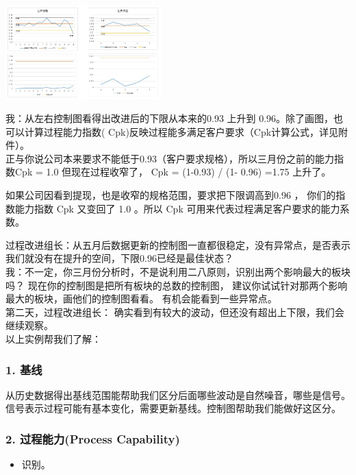 
\includegraphics[width=6cm]{控制图0.jpg}

我：从左右控制图看得出改进后的下限从本来的0.93 上升到
0.96。除了画图，也可以计算过程能力指数(
Cpk)反映过程能多满足客户要求（Cpk计算公式，详见附件）。\\
正与你说公司本来要求不能低于0.93（客户要求规格），所以三月份之前的能力指数Cpk
= 1.0 但现在过程收窄了， Cpk = (1-0.93) / (1- 0.96) =1.75 上升了。

如果公司因看到提现，也是收窄的规格范围，要求把下限调高到0.96 ，
你们的指数能力指数 Cpk 又变回了 1.0 。所以 Cpk
可用来代表过程满足客户要求的能力系数。

过程改进组长：从五月后数据更新的控制图一直都很稳定，没有异常点，是否表示我们就没有在提升的空间，下限0.96已经是最佳状态？\\
我：不一定，你三月份分析时，不是说利用二八原则，识别出两个影响最大的板块吗？
现在你的控制图是把所有板块的总数的控制图，
建议你试试针对那两个影响最大的板块，画他们的控制图看看。
有机会能看到一些异常点。\\
第二天，过程改进组长：
确实看到有较大的波动，但还没有超出上下限，我们会继续观察。\\
以上实例帮我们了解：

\hypertarget{ux57faux7ebf}{%
\subsubsection{1. 基线}\label{ux57faux7ebf}}

从历史数据得出基线范围能帮助我们区分后面哪些波动是自然噪音，哪些是信号。
信号表示过程可能有基本变化，需要更新基线。控制图帮助我们能做好这区分。

\hypertarget{ux8fc7ux7a0bux80fdux529bprocess-capability}{%
\subsubsection{2. 过程能力(Process
Capability)}\label{ux8fc7ux7a0bux80fdux529bprocess-capability}}

\begin{itemize}
\tightlist
\item
  识别。
\end{itemize}

